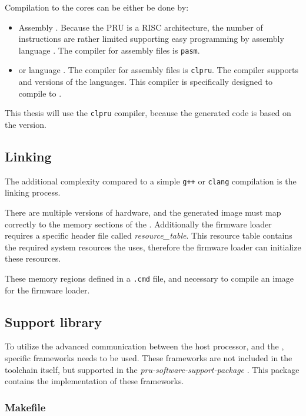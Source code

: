 Compilation to the \pru cores can be either be done by:
\begin{itemize}
	\item Assembly \citep{PRU_ASM}. Because the PRU is a RISC architecture, the number of instructions are rather limited supporting easy programming by assembly language \citep{PRU_ASM_INSTR}. The compiler for assembly files is \verb+pasm+.
	\item \cpl{} or \cpp{} language \citep{PRU_C_CPP}. The compiler for assembly files is \verb+clpru+. The compiler supports  and  versions of the languages. This compiler is specifically designed to compile to \pru.
\end{itemize}
This thesis will use the \verb+clpru+ compiler, because the generated code is based on the  version.

\subsection{Linking}
\label{subs:linking}

The additional complexity compared to a simple \verb/g++/ or \verb/clang/ compilation is the linking process.

There are multiple versions of \pru hardware, and the generated image must map correctly to the memory sections of the \pru. Additionally the firmware loader requires a specific header file called \emph{resource\_table}. This resource table contains the required system resources the \pru uses, therefore the firmware loader can initialize these resources.

These memory regions defined in a \verb+.cmd+ file, and necessary to compile an \elf image for the firmware loader.

\subsection{Support library}

To utilize the advanced communication between the host processor, and the \pru, specific frameworks needs to be used. These frameworks are not included in the \pru \cpp{} toolchain itself, but supported in the \emph{pru-software-support-package} \citep{TI_PRUSS_REPO}. This package contains the implementation of these  frameworks.

\subsubsection{Makefile}

